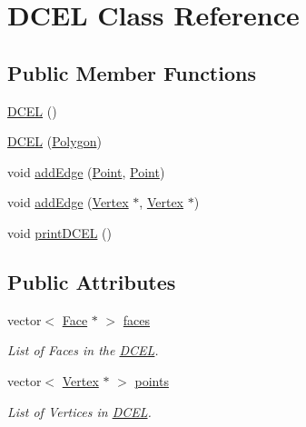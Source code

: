 \hypertarget{classDCEL}{}\section{D\+C\+EL Class Reference}
\label{classDCEL}
\subsection*{Public Member Functions}
\begin{DoxyCompactItemize}
\item 
\hyperlink{classDCEL_a5f12fccd0a8f0cd3450a21e9a2fafbd8}{D\+C\+EL} ()
\item 
\hyperlink{classDCEL_a8249e57b170cc6df5109231a3f189a15}{D\+C\+EL} (\hyperlink{classPolygon}{Polygon})
\item 
void \hyperlink{classDCEL_a513abdc4ca1faacef9d051a48a47c6c6}{add\+Edge} (\hyperlink{classPoint}{Point}, \hyperlink{classPoint}{Point})
\item 
void \hyperlink{classDCEL_aa4908d9d80085b2f13aee78bcc9e87c7}{add\+Edge} (\hyperlink{classVertex}{Vertex} $\ast$, \hyperlink{classVertex}{Vertex} $\ast$)
\item 
void \hyperlink{classDCEL_aaa419662b88fbdbe7e7a2276abf334a1}{print\+D\+C\+EL} ()
\end{DoxyCompactItemize}
\subsection*{Public Attributes}
\begin{DoxyCompactItemize}
\item 
\mbox{\label{classDCEL_a2d7fd9417422b18f18e8c55f1d1f49e2}} 
vector$<$ \hyperlink{classFace}{Face} $\ast$ $>$ \hyperlink{classDCEL_a2d7fd9417422b18f18e8c55f1d1f49e2}{faces}
\begin{DoxyCompactList}\small\item\em List of Faces in the \hyperlink{classDCEL}{D\+C\+EL}. \end{DoxyCompactList}\item 
\mbox{\label{classDCEL_a278f95abee6905f3b496d4be57dc1eab}} 
vector$<$ \hyperlink{classVertex}{Vertex} $\ast$ $>$ \hyperlink{classDCEL_a278f95abee6905f3b496d4be57dc1eab}{points}
\begin{DoxyCompactList}\small\item\em List of Vertices in \hyperlink{classDCEL}{D\+C\+EL}. \end{DoxyCompactList}\end{DoxyCompactItemize}


